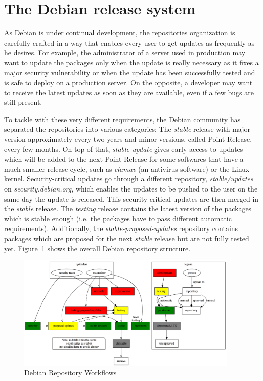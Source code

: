 \documentclass[11pt, upma4paper, twoside, openany, parskip=half]{book}
\begin{document}
\section{The Debian release system}
As Debian is under continual development, the repositories organization is carefully crafted in a way that enables every user to get updates as frequently as he desires. For example, the administrator of a server used in production may want to update the packages only when the update is really necessary as it fixes a major security vulnerability or when the update has been successfully tested and is safe to deploy on a production server. On the opposite, a developer may want to receive the latest updates as soon as they are available, even if a few bugs are still present.

To tackle with these very different requirements, the Debian community has separated the repositories into various categories; The \emph{stable} release with major version approximately every two years and minor versions, called Point Release, every few months. On top of that, \emph{stable-update} gives early access to updates which will be added to the next Point Release for some softwares that have a much smaller release cycle, such as \emph{clamav} (an antivirus software) or the Linux kernel. Security-critical updates go through a different repository, \emph{stable/updates} on \emph{security.debian.org}, which enables the updates to be pushed to the user on the same day the update is released. This security-critical updates are then merged in the \emph{stable} release. The \emph{testing} release contains the latest version of the packages which is stable enough (i.e. the packages have to pass different automatic requirements). Additionally, the \emph{stable-proposed-updates} repository contains packages which are proposed for the next \emph{stable} release but are not fully tested yet. Figure~\ref{debian_repo_summary} shows the overall Debian repository structure.

\begin{figure}
\centering
\includegraphics[width=400px]{debian_repo_summary.png}
\caption{Debian Repository Workflows \cite{debian_debianreleases_????}}
\label{debian_repo_summary}
\end{figure}
\end{document}
